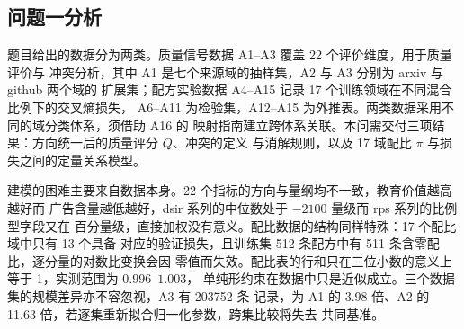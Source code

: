\documentclass[bwprint]{gmcmthesis}
\numberwithin{equation}{section}
\numberwithin{figure}{section}
\numberwithin{table}{section}
\begin{document}


%
%
\subsection{问题一分析}

题目给出的数据分为两类。质量信号数据 A1--A3 覆盖 22 个评价维度，用于质量评价与
冲突分析，其中 A1 是七个来源域的抽样集，A2 与 A3 分别为 arxiv 与 github 两个域的
扩展集；配方实验数据 A4--A15 记录 17 个训练领域在不同混合比例下的交叉熵损失，
A6--A11 为检验集，A12--A15 为外推表。两类数据采用不同的域分类体系，须借助 A16 的
映射指南建立跨体系关联。本问需交付三项结果：方向统一后的质量评分 $Q$、冲突的定义
与消解规则，以及 17 域配比 $\pi$ 与损失之间的定量关系模型。

建模的困难主要来自数据本身。22 个指标的方向与量纲均不一致，教育价值越高越好而
广告含量越低越好，dsir 系列的中位数处于 $-2100$ 量级而 rps 系列的比例型字段又在
百分量级，直接加权没有意义。配比数据的结构同样特殊：17 个配比域中只有 13 个具备
对应的验证损失，且训练集 512 条配方中有 511 条含零配比，逐分量的对数比变换会因
零值而失效。配比表的行和只在三位小数的意义上等于 1，实测范围为 $0.996$--$1.003$，
单纯形约束在数据中只是近似成立。三个数据集的规模差异亦不容忽视，A3 有 203752 条
记录，为 A1 的 3.98 倍、A2 的 11.63 倍，若逐集重新拟合归一化参数，跨集比较将失去
共同基准。
\end{document}
